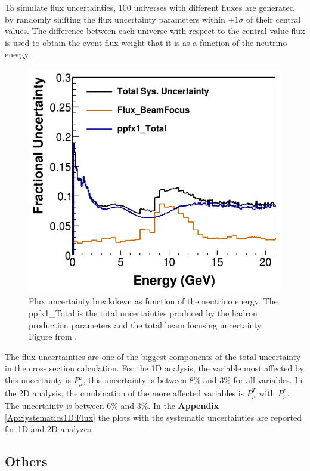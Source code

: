 To simulate flux uncertainties, 100 universes with different fluxes are generated by randomly shifting the flux uncertainty parameters within $\pm1\sigma$ of their central values. The difference between each universe with respect to the central value flux is used to obtain the event flux weight that it is as a function of the neutrino energy. 

\begin{figure}[!htb]
    \centering
    \includegraphics[scale=0.4]{Figures/Chapter6/BeamUncertainties.png}
    \caption{Flux uncertainty breakdown as function of the neutrino energy. The ppfx1\_Total is the total uncertainties produced by the hadron production parameters and the total beam focusing uncertainty. Figure from \cite{BenThesis}.}
    \label{fig:Systematics:FluxUncertainties}
\end{figure} 

The flux uncertainties are one of the biggest components of the total uncertainty in the cross section calculation. For the 1D analysis, the variable most affected by this uncertainty is $P^z_\mu$, this uncertainty is between 8\% and 3\% for all variables. In the 2D analysis, the combination of the more affected variables is $P^T_\mu$ with $P^z_\mu$. The uncertainty is between 6\% and 3\%. In the \textbf{Appendix} \ref{Ap:Systematics1D:Flux} the plots with the systematic uncertainties are reported for 1D and 2D analyzes. 

\subsection{Others}
\label{Cap:ErrorAnalysis:SystematicUnc:Others}

